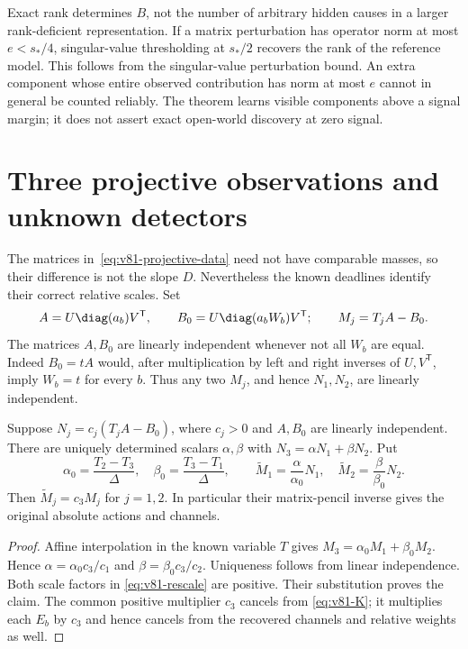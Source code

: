 \begin{remark}\label{rem:v81-count}
Exact rank determines $B$, not the number of arbitrary hidden causes in
a larger rank-deficient representation.  If a matrix perturbation has
operator norm at most $e<s_*/4$, singular-value thresholding at $s_*/2$
recovers the rank of the reference model.  This follows from the
singular-value perturbation bound.  An extra component whose entire
observed contribution has norm at most $e$ cannot in general be counted
reliably.  The theorem learns visible components above a signal margin;
it does not assert exact open-world discovery at zero signal.
\end{remark}

\section{Three projective observations and unknown detectors}
\label{sec:v81-projective}

The matrices in~\eqref{eq:v81-projective-data} need not have comparable
masses, so their difference is not the slope $D$.  Nevertheless the
known deadlines identify their correct relative scales.  Set
\[
 A=U\diag(a_b)V^{\mathsf T},\qquad
 B_0=U\diag(a_bW_b)V^{\mathsf T};\qquad M_j=T_jA-B_0.
\]
The matrices $A,B_0$ are linearly independent whenever not all $W_b$
are equal.  Indeed $B_0=tA$ would, after multiplication by left and
right inverses of $U,V^{\mathsf T}$, imply $W_b=t$ for every $b$.
Thus any two $M_j$, and hence $N_1,N_2$, are linearly independent.

\begin{lemma}\label{lem:v81-projective}
Suppose $N_j=c_j(T_jA-B_0)$, where $c_j>0$ and $A,B_0$ are linearly
independent.  There are uniquely determined scalars $\alpha,\beta$ with
$N_3=\alpha N_1+\beta N_2$.  Put
\begin{equation}\label{eq:v81-rescale}
 \alpha_0=\frac{T_2-T_3}{\Delta},\quad
 \beta_0=\frac{T_3-T_1}{\Delta},\qquad
 \widetilde M_1=\frac{\alpha}{\alpha_0}N_1,\quad
 \widetilde M_2=\frac{\beta}{\beta_0}N_2.
\end{equation}
Then $\widetilde M_j=c_3M_j$ for $j=1,2$.  In particular their
matrix-pencil inverse gives the original absolute actions and channels.
\end{lemma}
\begin{proof}
Affine interpolation in the known variable $T$ gives
$M_3=\alpha_0M_1+\beta_0M_2$.  Hence
$\alpha=\alpha_0c_3/c_1$ and $\beta=\beta_0c_3/c_2$.
Uniqueness follows from linear independence.  Both scale factors in
\eqref{eq:v81-rescale} are positive.  Their substitution proves the
claim.  The common positive multiplier $c_3$ cancels from
\eqref{eq:v81-K}; it multiplies each $E_b$ by $c_3$ and hence cancels
from the recovered channels and relative weights as well.
\end{proof}

